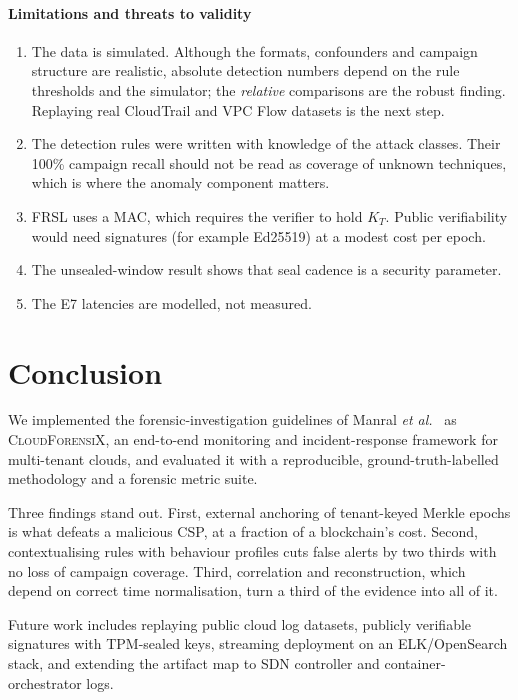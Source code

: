 \documentclass[conference,10pt]{IEEEtran}
\newcommand{\ours}{\textsc{CloudForensiX}}
\begin{document}
\paragraph*{Limitations and threats to validity}
\begin{enumerate}
\item The data is simulated. Although the formats, confounders and campaign structure are realistic, absolute detection numbers depend on the rule thresholds and the simulator; the \emph{relative} comparisons are the robust finding. Replaying real CloudTrail and VPC Flow datasets is the next step.
\item The detection rules were written with knowledge of the attack classes. Their 100\% campaign recall should not be read as coverage of unknown techniques, which is where the anomaly component matters.
\item FRSL uses a MAC, which requires the verifier to hold $K_T$. Public verifiability would need signatures (for example Ed25519) at a modest cost per epoch.
\item The unsealed-window result shows that seal cadence is a security parameter.
\item The E7 latencies are modelled, not measured.
\end{enumerate}

\section{Conclusion}
We implemented the forensic-investigation guidelines of Manral \textit{et al.}~\cite{manral2019} as \ours{}, an end-to-end monitoring and incident-response framework for multi-tenant clouds, and evaluated it with a reproducible, ground-truth-labelled methodology and a forensic metric suite.

Three findings stand out. First, external anchoring of tenant-keyed Merkle epochs is what defeats a malicious CSP, at a fraction of a blockchain's cost. Second, contextualising rules with behaviour profiles cuts false alerts by two thirds with no loss of campaign coverage. Third, correlation and reconstruction, which depend on correct time normalisation, turn a third of the evidence into all of it.

Future work includes replaying public cloud log datasets, publicly verifiable signatures with TPM-sealed keys, streaming deployment on an ELK/OpenSearch stack, and extending the artifact map to SDN controller and container-orchestrator logs.
\end{document}

